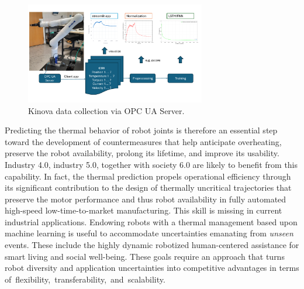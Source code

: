 \documentclass{ifacconf}
\begin{document}
\begin{figure}[t!]
	\begin{center}
		\includegraphics[width=0.7\textwidth]{pictures/DataCollection.pdf} 
		\caption{Kinova data collection via OPC UA Server.} 
		\label{fig:DataAquisition}
	\end{center}
\end{figure}

Predicting the thermal behavior of robot joints is therefore an essential step toward the development of countermeasures that help anticipate overheating, preserve the robot availability,  prolong its lifetime, and improve its usability. Industry 4.0, industry 5.0, together with society 6.0 are likely to benefit from this capability. In fact, the thermal prediction propels operational efficiency through its significant contribution to the design of thermally uncritical trajectories that  preserve the motor performance and thus robot availability in fully automated high-speed low-time-to-market manufacturing. This skill is missing in current industrial applications. Endowing robots with a thermal management based upon machine learning is useful to accommodate uncertainties emanating from \textit{unseen} events. These include the highly dynamic robotized human-centered assistance for smart living and social well-being. These goals require an approach that turns robot diversity and application uncertainties into competitive advantages in terms \mbox{of flexibility,  transferability, and scalability.}
\end{document}
